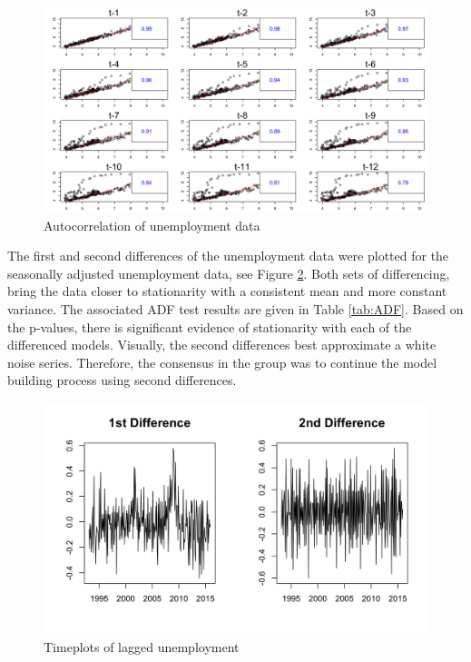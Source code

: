 \documentclass[twoside,twocolumn]{article}
\begin{document}
		\begin{figure}[htb]
		\centering
		\caption{Autocorrelation of unemployment data}
		\label{fig:laggedunemployment}
		\includegraphics[width=\linewidth]{images/laggedunemployment}
	\end{figure}
The first and second differences of the unemployment data were plotted for the seasonally adjusted unemployment data, see Figure \ref{fig:seasonalunem}. Both sets of differencing, bring the data closer to stationarity with a consistent mean and more constant variance. The associated ADF test results are given in Table \ref{tab:ADF}. Based on the p-values, there is significant evidence of stationarity with each of the differenced models. Visually, the second differences best approximate a white noise series. Therefore, the consensus in the group was to continue the model building process using second differences.
	\begin{figure}[htb]
		\centering
		\caption{Timeplots of lagged unemployment}
		\label{fig:seasonalunem}
		\includegraphics[width=\linewidth]{images/seasonalunem}
	\end{figure}
\end{document}
